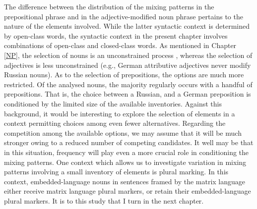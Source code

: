 The difference between the distribution of the mixing patterns in the prepositional phrase and in the adjective-modified noun phrase pertains to the nature of the elements involved. While the latter syntactic context is determined by open-class words, the syntactic context in the present chapter involves combinations of open-class and closed-class words. As mentioned in Chapter \ref{NP}, the selection of nouns is an unconstrained process \citep{boumans-syntax-1998}, whereas the selection of adjectives is less unconstrained (e.g., German attributive adjectives never modify Russian nouns). As to the selection of  prepositions, the options are much more restricted. Of the analysed nouns, the majority regularly occurs with a handful of prepositions. That is, the choice between a Russian, and a German preposition is conditioned by the limited size of the available inventories. Against this background, it would be interesting to explore the selection of elements in a context permitting choices among even fewer alternatives. Regarding the competition among the available options, we may assume that it will be much stronger owing to a reduced number of competing candidates. It well may be that in this situation, frequency will play even a more crucial role in conditioning the mixing patterns. One context which allows us to investigate variation in mixing patterns involving a small inventory of elements is plural marking. In this context, embedded-language nouns in sentences framed by the matrix language either receive  matrix language plural markers, or retain their embedded-language plural markers. It is to this study that I turn in the next chapter.


